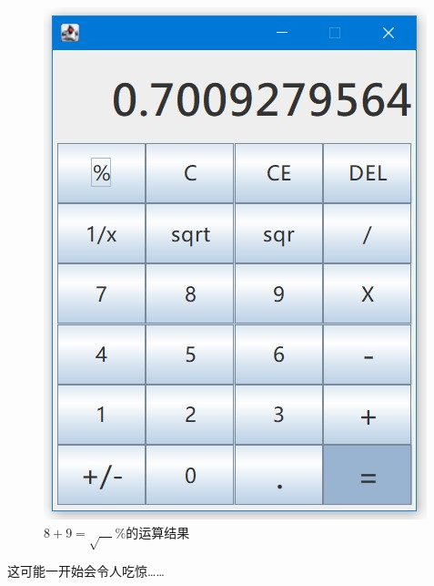 \documentclass{ctexart}
\begin{document}
\begin{figure}[htbp]
    \centering
    \caption{$8+9=\sqrt{\quad}\%$的运算结果}\label{fig:4}
    \includegraphics[scale=0.50]{5.jpg} 
\end{figure}
这可能一开始会令人吃惊……
\end{document}
